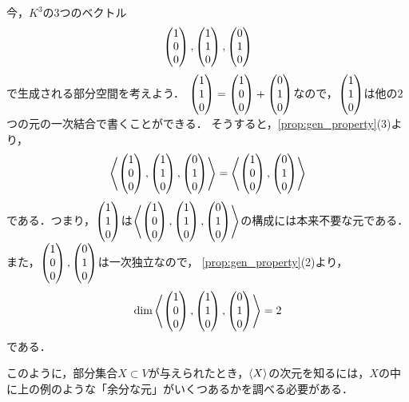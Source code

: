 \begin{example}
今，$K^3$の3つのベクトル
\[
  \pmt{1 \\ 0 \\ 0}, \pmt{1 \\ 1 \\ 0}, \pmt{0 \\ 1 \\ 0}  
\]
で生成される部分空間を考えよう．
$\pmt{1 \\ 1 \\ 0} = \pmt{1 \\ 0 \\ 0} + \pmt{0 \\ 1 \\ 0}$なので，$\pmt{1 \\ 1 \\ 0}$は他の2つの元の一次結合で書くことができる．
そうすると，\cref{prop:gen_property}(3)より，
\[
  \gen{\pmt{1 \\ 0 \\ 0}, \pmt{1 \\ 1 \\ 0}, \pmt{0 \\ 1 \\ 0}}%
  = \gen{\pmt{1 \\ 0 \\ 0}, \pmt{0 \\ 1 \\ 0} }
\]
である．つまり，$\pmt{1 \\ 1 \\ 0}$は$\gen{\pmt{1 \\ 0 \\ 0}, \pmt{1 \\ 1 \\ 0}, \pmt{0 \\ 1 \\ 0}}$の構成には本来不要な元である．
また，$\pmt{1 \\ 0 \\ 0}, \pmt{0 \\ 1 \\ 0}$は一次独立なので，
\cref{prop:gen_property}(2)より，
\[
  \dim \gen{\pmt{1 \\ 0 \\ 0}, \pmt{1 \\ 1 \\ 0}, \pmt{0 \\ 1 \\ 0}} = 2
\]
である．
\end{example}
このように，部分集合$X \subset V$が与えられたとき，$\gen{X}$の次元を知るには，$X$の中に上の例のような「余分な元」がいくつあるかを調べる必要がある．
